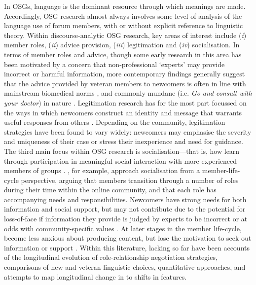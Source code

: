 In \glspl{OSG}, language is the dominant resource through which meanings are made. Accordingly, \gls{OSG} research almost always involves some level of analysis of the language use of \gls{forum} \glspl{member}, with or without explicit reference to linguistic theory. Within discourse\hyp{}analytic \gls{OSG} research, key areas of interest include (\emph{i}) member roles, (\emph{ii}) advice provision, (\emph{iii}) legitimation and (\emph{iv}) socialisation. In terms of \gls{member} roles and advice, though some early research in this area has been motivated by a concern that non\hyp{}professional `experts' may provide incorrect or harmful information, more contemporary findings generally suggest that the advice provided by veteran members to newcomers is often in line with mainstream biomedical norms \cite{vayreda_social_2009}, and commonly mundane (i.e. \emph{Go and consult with your doctor}) in nature \cite{smithson_problem_2011}. Legitimation research has for the most part focussed on the ways in which newcomers construct an identity and message that warrants useful responses from others \cite{galegher_legitimacy_1998,west_facework_2010}. Depending on the community, legitimation strategies have been found to vary widely: newcomers may emphasise the severity and uniqueness of their case \cite{varga2014grieving} or stress their inexperience and need for guidance. The third main focus within \gls{OSG} research is socialisation---that is, how  learn through participation in meaningful social interaction with more experienced members of groups \cite{ochs_socialization_1991}. \textcite{lee_new_2014}, for example, approach socialisation from a member\hyp{}life\hyp{}cycle perspective, arguing that \glspl{member} transition through a number of roles during their time within the online community, and that each role has accompanying needs and responsibilities. Newcomers have strong needs for both information and social support, but may not contribute due to the potential for loss\hyp{}of\hyp{}face if information they provide is judged by experts to be incorrect \cite{fuller_innovation_2007} or at odds with community\hyp{}specific values \cite{weber_missed_2011}. At later stages in the \gls{member} life\hyp{}cycle,  become less anxious about producing content, but lose the motivation to seek out information or support \cite{lee_new_2014}. Within this literature, lacking so far have been accounts of the longitudinal evolution of role\hyp{}relationship negotiation strategies, comparisons of new and veteran  linguistic choices, quantitative approaches, and attempts to map longitudinal change in  to shifts in  features.

